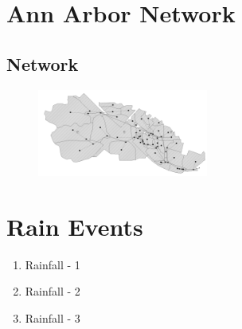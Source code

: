 \documentclass{article}
\begin{document}
\section{Ann Arbor Network}

\subsection{Network}

\begin{figure}[H]
  \centering
  \includegraphics[width = 0.5\textwidth]{Cyndee_Test.PNG}
\end{figure}


\section{Rain Events}

\begin{enumerate}
\item Rainfall - 1
\item Rainfall - 2
\item Rainfall - 3
\end{enumerate} 
\end{document}
